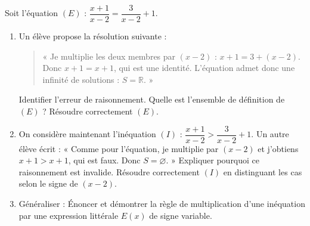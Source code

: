 \documentclass[11pt]{article}
\begin{document}
\begin{exercice}
Soit l'équation $(E)$ : $\dfrac{x+1}{x-2} = \dfrac{3}{x-2} + 1$.
\begin{enumerate}
    \item Un élève propose la résolution suivante :
    \begin{quote}
    « Je multiplie les deux membres par $(x-2)$ : $x+1 = 3 + (x-2)$.
    Donc $x+1 = x+1$, qui est une identité.
    L'équation admet donc une infinité de solutions : $S = \mathbb{R}$. »
    \end{quote}
    Identifier l'erreur de raisonnement. Quelle est l'ensemble de définition de $(E)$ ? Résoudre correctement $(E)$.
    \item On considère maintenant l'inéquation $(I)$ : $\dfrac{x+1}{x-2} > \dfrac{3}{x-2} + 1$.
    Un autre élève écrit : « Comme pour l'équation, je multiplie par $(x-2)$ et j'obtiens $x+1 > x+1$, qui est faux. Donc $S = \varnothing$. »
    Expliquer pourquoi ce raisonnement est invalide. Résoudre correctement $(I)$ en distinguant les cas selon le signe de $(x-2)$.
    \item Généraliser : Énoncer et démontrer la règle de multiplication d'une inéquation par une expression littérale $E(x)$ de signe variable.
\end{enumerate}
\end{exercice}
\end{document}

